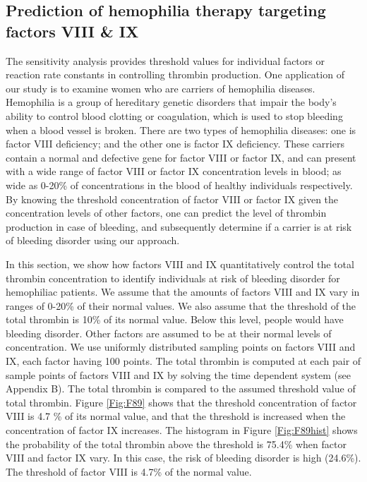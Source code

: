 \subsection*{Prediction of hemophilia therapy targeting factors VIII \& IX}
The sensitivity analysis provides threshold values for individual
factors or reaction rate constants in controlling thrombin
production. One application of our study is to examine women who are
carriers of hemophilia diseases. Hemophilia is a group of hereditary genetic
disorders that impair the body's ability to control blood clotting
or coagulation, which is used to stop bleeding when a blood vessel
is broken. There are two types of hemophilia diseases: one is factor
VIII deficiency; and the other one is factor IX deficiency. These
carriers contain a normal and defective gene for factor VIII or
factor IX, and can present with a wide range of factor VIII or
factor IX concentration levels in blood; as wide as 0-20\% of 
 concentrations in the blood of healthy individuals respectively. By knowing the threshold concentration
of factor VIII or factor IX given the concentration levels of other
factors, one can predict the level of thrombin production in case of
bleeding, and subsequently determine if a carrier is at risk of
bleeding disorder using our approach.

In this section, we show how factors VIII and IX quantitatively
control the total thrombin concentration to identify individuals at
risk of bleeding disorder for hemophiliac patients. We assume that
the amounts of factors VIII and IX vary in ranges of 0-20\% of their
normal values. We also assume that the threshold of the total
thrombin is 10\% of its normal value. Below this level, people would
have bleeding disorder. Other factors are assumed to be at their
normal levels of concentration. We use uniformly distributed
sampling points on factors VIII and IX, each factor having 100
points. The total thrombin is computed at each pair of sample points
of factors VIII and IX by solving the time dependent system (see
Appendix B). The total thrombin is compared to the assumed threshold
value of total thrombin. Figure \ref{Fig:F89} shows that the
threshold concentration of factor VIII is 4.7 \% of its normal
value, and that the threshold is increased when the concentration of
factor IX increases. The histogram in Figure \ref{Fig:F89hist} shows
the probability of the total thrombin above the threshold is 75.4\%
when factor VIII and factor IX vary. In this case, the risk of
bleeding disorder is high (24.6\%). The threshold of factor VIII is
4.7\% of the normal value.



